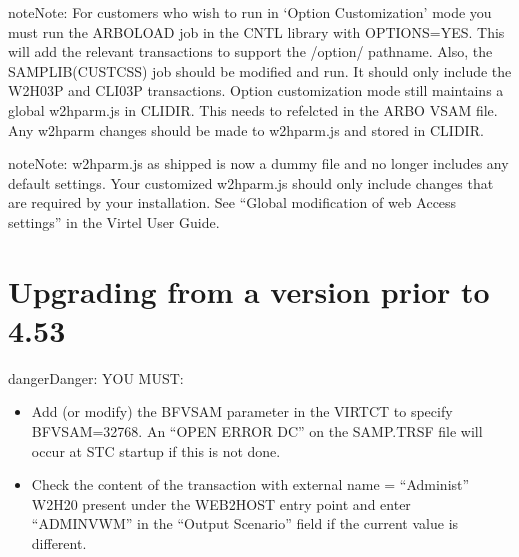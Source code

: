 \documentclass[letterpaper,10pt,english]{sphinxmanual}
\begin{document}
\begin{sphinxadmonition}{note}{Note:}
\sphinxAtStartPar
For customers who wish to run in ‘Option Customization’ mode you must run the ARBOLOAD job in the CNTL library with OPTIONS=YES. This will add the relevant transactions to support the /option/ pathname. Also, the SAMPLIB(CUSTCSS) job should be modified and run. It should only include the W2H\sphinxhyphen{}03P and CLI\sphinxhyphen{}03P transactions. Option customization mode still maintains a global w2hparm.js in CLI\sphinxhyphen{}DIR. This needs to refelcted in the ARBO VSAM file. Any w2hparm changes should be made to w2hparm.js and stored in CLI\sphinxhyphen{}DIR.
\end{sphinxadmonition}

\begin{sphinxadmonition}{note}{Note:}
\sphinxAtStartPar
w2hparm.js as shipped is now a dummy file and no longer includes any default settings. Your customized w2hparm.js should only include changes that are required by your installation. See “Global modification of web Access settings” in the Virtel User Guide.
\end{sphinxadmonition}

\ignorespaces 

\section{Upgrading from a version prior to 4.53}
\label{\detokenize{Migration_Guide:upgrading-from-a-version-prior-to-4-53}}\label{\detokenize{Migration_Guide:index-3}}
\begin{sphinxadmonition}{danger}{Danger:}
\sphinxAtStartPar
YOU MUST:
\end{sphinxadmonition}
\begin{itemize}
\item {} 
\sphinxAtStartPar
Add (or modify) the BFVSAM parameter in the VIRTCT to specify BFVSAM=32768. An “OPEN ERROR DC” on the SAMP.TRSF file will occur at STC startup if this is not done.

\item {} 
\sphinxAtStartPar
Check the content of the transaction with external name = “Administ” \sphinxhyphen{} W2H\sphinxhyphen{}20 \sphinxhyphen{} present under the WEB2HOST entry point and enter “ADMINVWM” in the “Output Scenario” field if the current value is different.

\end{itemize}
\end{document}
